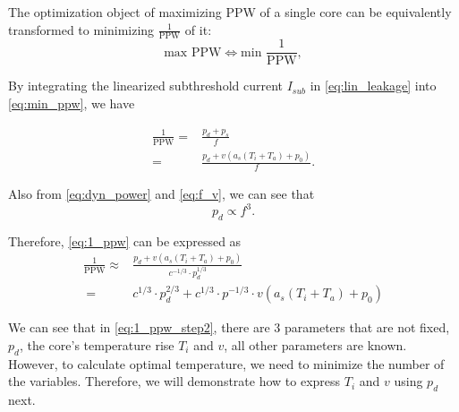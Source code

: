 The optimization object of maximizing PPW of a single core can be equivalently transformed to minimizing $\frac{1}{\text{PPW}}$ of it:
\begin{equation}\label{eq:min_ppw}
\text{max PPW}\Longleftrightarrow \text{min } \frac{1}{\text{PPW}},
\end{equation}

By integrating the linearized subthreshold current $I_{sub}$ in \eqref{eq:lin_leakage} into \eqref{eq:min_ppw}, we have

\begin{equation}\label{eq:1_ppw}
\begin{split}
\frac{1}{\text{PPW}} = &\frac{p_{d}+p_{s}}{f}\\
= &\frac{p_{d}+v(a_{s}(T_{i}+T_{a})+p_{0})}{f}.
\end{split}
\end{equation}

Also from \eqref{eq:dyn_power} and \eqref{eq:f_v}, we can see that
\begin{equation}\label{eq:pd_prop_f}
p_{d} \propto f^{3}.
\end{equation}

Therefore, \eqref{eq:1_ppw} can be expressed as
\begin{equation}\label{eq:1_ppw_step2}
\begin{split}
\frac{1}{\text{PPW}} \approx  &\frac{p_{d}+v(a_{s}(T_{i}+T_{a})+p_{0})}{c^{-1/3} \cdot p_{d}^{1/3}}\\\
=&c^{1/3}\cdot p_{d}^{2/3}+c^{1/3} \cdot  p^{-1/3}\cdot v(a_{s}(T_{i}+T_{a})+p_{0})
\end{split}
\end{equation}

We can see that in \eqref{eq:1_ppw_step2}, there are $3$ parameters that are not fixed, $p_{d}$, the core's temperature rise $T_{i}$ and $v$, all other parameters are known. However, to calculate optimal temperature, we need to minimize the number of the variables. Therefore, we will demonstrate how to express $T_{i}$ and $v$ using $p_{d}$ next.

